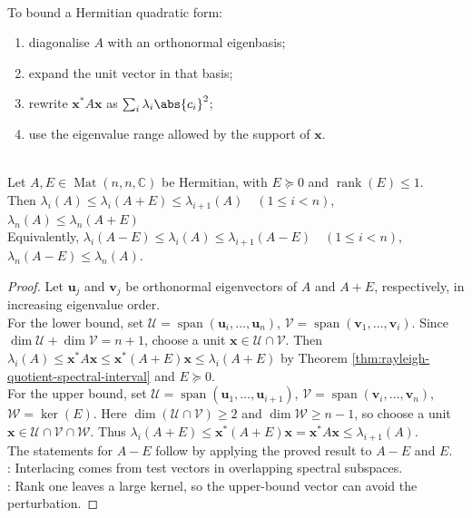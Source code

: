 \begin{method} \label{meth:rayleigh-eigenbasis-method} \\
To bound a Hermitian quadratic form:
\begin{enumerate}[label=(\roman*)]
\setlength{\itemsep}{0pt}
\item diagonalise $A$ with an orthonormal eigenbasis;
\item expand the unit vector in that basis;
\item rewrite $\mathbf{x}^*A\mathbf{x}$ as $\sum_i\lambda_i\abs{c_i}^2$;
\item use the eigenvalue range allowed by the support of $\mathbf{x}$.
\end{enumerate}
\end{method}

\begin{theorem} \label{thm:rank-one-psd-eigenvalue-interlacing} \\
Let $A,E\in\operatorname{Mat}(n,n,\mathbb{C})$ be Hermitian, with $E\succeq0$ and $\operatorname{rank}(E)\leq1$.\\
Then $\lambda_i(A)\leq\lambda_i(A+E)\leq\lambda_{i+1}(A)\quad(1\leq i<n)$, $\lambda_n(A)\leq\lambda_n(A+E)$\\
Equivalently, $\lambda_i(A-E)\leq\lambda_i(A)\leq\lambda_{i+1}(A-E)\quad(1\leq i<n)$, $\lambda_n(A-E)\leq\lambda_n(A)$.
\begin{proof}
Let $\mathbf{u}_j$ and $\mathbf{v}_j$ be orthonormal eigenvectors of $A$ and $A+E$, respectively, in increasing eigenvalue order.\\
For the lower bound, set $\mathcal{U}=\operatorname{span}(\mathbf{u}_i,\ldots,\mathbf{u}_n)$, $\mathcal{V}=\operatorname{span}(\mathbf{v}_1,\ldots,\mathbf{v}_i)$. Since $\dim\mathcal{U}+\dim\mathcal{V}=n+1$, choose a unit $\mathbf{x}\in\mathcal{U}\cap\mathcal{V}$. Then $\lambda_i(A)\leq \mathbf{x}^*A\mathbf{x}\leq \mathbf{x}^*(A+E)\mathbf{x}\leq\lambda_i(A+E)$ by Theorem \ref{thm:rayleigh-quotient-spectral-interval} and $E\succeq0$.\\
For the upper bound, set $\mathcal{U}=\operatorname{span}(\mathbf{u}_1,\ldots,\mathbf{u}_{i+1})$, $\mathcal{V}=\operatorname{span}(\mathbf{v}_i,\ldots,\mathbf{v}_n)$, $\mathcal{W}=\ker(E)$. Here $\dim(\mathcal{U}\cap\mathcal{V})\geq2$ and $\dim\mathcal{W}\geq n-1$, so choose a unit $\mathbf{x}\in\mathcal{U}\cap\mathcal{V}\cap\mathcal{W}$. Thus $\lambda_i(A+E)\leq \mathbf{x}^*(A+E)\mathbf{x} =\mathbf{x}^*A\mathbf{x} \leq \lambda_{i+1}(A)$.\\
The statements for $A-E$ follow by applying the proved result to $A-E$ and $E$.\\
: Interlacing comes from test vectors in overlapping spectral subspaces.\\
: Rank one leaves a large kernel, so the upper-bound vector can avoid the perturbation.
\end{proof}
\end{theorem}

